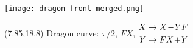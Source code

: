 \documentclass[final]{beamer}
\newcommand{\nt}{\negthinspace}
\newcommand{\m}{\nt-\nt}
\newcommand{\p}{\nt+\nt}
\begin{document}
\begin{frame}{}
\texttt{[image: dragon-front-merged.png]}
\begin{textblock}{20}(7.85,18.8) %
Dragon curve: $\pi/2$, $FX$,
{\small
$\begin{aligned}
X &\to X\m YF \\
Y &\to FX\p Y
\end{aligned}$}
\end{textblock}
\end{frame}
\end{document}
